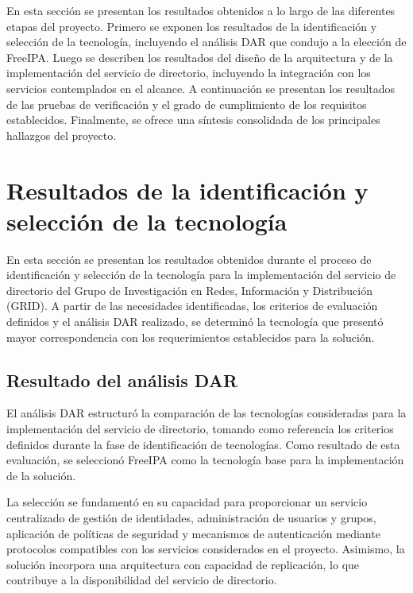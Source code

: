 \label{cap:resultados}
\vspace*{0.7cm}

En esta sección se presentan los resultados obtenidos a lo largo de las diferentes etapas del proyecto. Primero se exponen los resultados de la identificación y selección de la tecnología, incluyendo el análisis DAR que condujo a la elección de FreeIPA. Luego se describen los resultados del diseño de la arquitectura y de la implementación del servicio de directorio, incluyendo la integración con los servicios contemplados en el alcance. A continuación se presentan los resultados de las pruebas de verificación y el grado de cumplimiento de los requisitos establecidos. Finalmente, se ofrece una síntesis consolidada de los principales hallazgos del proyecto.

\section{Resultados de la identificación y selección de la tecnología}
\label{sec:resultados-seleccion}

En esta sección se presentan los resultados obtenidos durante el proceso de identificación y selección de la tecnología para la implementación del servicio de directorio del Grupo de Investigación en Redes, Información y Distribución (GRID). A partir de las necesidades identificadas, los criterios de evaluación definidos y el análisis DAR realizado, se determinó la tecnología que presentó mayor correspondencia con los requerimientos establecidos para la solución.

\subsection{Resultado del análisis DAR}
\label{subsec:resultado-dar}

El análisis DAR estructuró la comparación de las tecnologías consideradas para la implementación del servicio de directorio, tomando como referencia los criterios definidos durante la fase de identificación de tecnologías. Como resultado de esta evaluación, se seleccionó FreeIPA como la tecnología base para la implementación de la solución.

La selección se fundamentó en su capacidad para proporcionar un servicio centralizado de gestión de identidades, administración de usuarios y grupos, aplicación de políticas de seguridad y mecanismos de autenticación mediante protocolos compatibles con los servicios considerados en el proyecto. Asimismo, la solución incorpora una arquitectura con capacidad de replicación, lo que contribuye a la disponibilidad del servicio de directorio.

